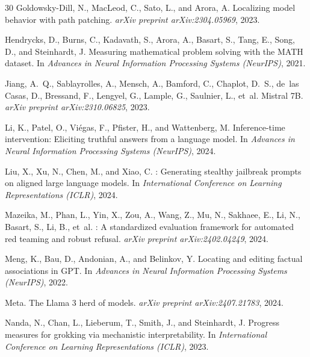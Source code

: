 \documentclass[11pt]{article}
\begin{document}
\begin{thebibliography}{30}
Goldowsky-Dill, N., MacLeod, C., Sato, L., and Arora, A.
\newblock Localizing model behavior with path patching.
\newblock \emph{arXiv preprint arXiv:2304.05969}, 2023.

Hendrycks, D., Burns, C., Kadavath, S., Arora, A., Basart, S., Tang, E., Song, D., and Steinhardt, J.
\newblock Measuring mathematical problem solving with the {MATH} dataset.
\newblock In \emph{Advances in Neural Information Processing Systems (NeurIPS)}, 2021.

Jiang, A.~Q., Sablayrolles, A., Mensch, A., Bamford, C., Chaplot, D.~S., de~las Casas, D., Bressand, F., Lengyel, G., Lample, G., Saulnier, L., et~al.
\newblock Mistral {7B}.
\newblock \emph{arXiv preprint arXiv:2310.06825}, 2023.

Li, K., Patel, O., Vi\'{e}gas, F., Pfister, H., and Wattenberg, M.
\newblock Inference-time intervention: Eliciting truthful answers from a language model.
\newblock In \emph{Advances in Neural Information Processing Systems (NeurIPS)}, 2024.

Liu, X., Xu, N., Chen, M., and Xiao, C.
: Generating stealthy jailbreak prompts on aligned large language models.
\newblock In \emph{International Conference on Learning Representations (ICLR)}, 2024.

Mazeika, M., Phan, L., Yin, X., Zou, A., Wang, Z., Mu, N., Sakhaee, E., Li, N., Basart, S., Li, B., et~al.
: A standardized evaluation framework for automated red teaming and robust refusal.
\newblock \emph{arXiv preprint arXiv:2402.04249}, 2024.

Meng, K., Bau, D., Andonian, A., and Belinkov, Y.
\newblock Locating and editing factual associations in {GPT}.
\newblock In \emph{Advances in Neural Information Processing Systems (NeurIPS)}, 2022.

Meta.
\newblock The {L}lama 3 herd of models.
\newblock \emph{arXiv preprint arXiv:2407.21783}, 2024.

Nanda, N., Chan, L., Lieberum, T., Smith, J., and Steinhardt, J.
\newblock Progress measures for grokking via mechanistic interpretability.
\newblock In \emph{International Conference on Learning Representations (ICLR)}, 2023.


\end{thebibliography}
\end{document}
